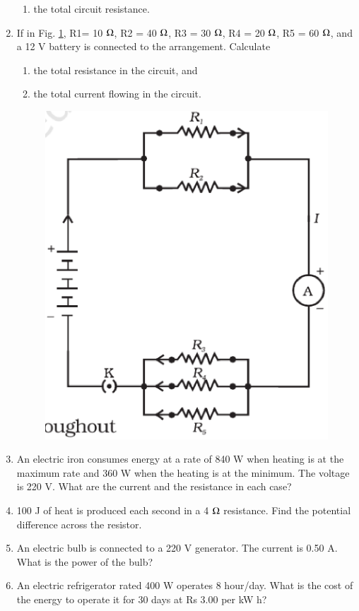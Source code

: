 \begin{enumerate}[label=\arabic*.,ref=\thesection.\theenumi]
\begin{enumerate}
\item   the total circuit resistance.
\end{enumerate}
\item  If in Fig. \ref{fig:ckt_class10},
R1= 10 $\ohm$, R2 = 40 $\ohm$, R3 = 30 $\ohm$, R4 = 20 $\ohm$, R5 = 60 $\ohm$,
and a 12 V battery is connected to the arrangement. Calculate 
%
\begin{enumerate}
\item  the total resistance in the circuit, and 
\item  the total current flowing in the circuit.
\end{enumerate}

\begin{figure}[!ht]
\centering
\includegraphics[width=\columnwidth]{./figs/ckt.eps}
\caption{}
\label{fig:ckt_class10}
\end{figure}
\item  An electric iron consumes energy at a rate of 840 W when heating is at the maximum rate and 360 W when the heating is at the minimum. The voltage is 220 V. What are the current and the resistance in each case?
\item  100 J of heat is produced each second in a 4 $\ohm$ resistance. Find the potential difference across the resistor.
\item  An electric bulb is connected to a 220 V generator. The current is 0.50 A. What is the power of the bulb?
\item  An electric refrigerator rated 400 W operates 8 hour/day. What is the cost of the energy to operate it for 30 days at Rs 3.00 per kW h?
\end{enumerate}
